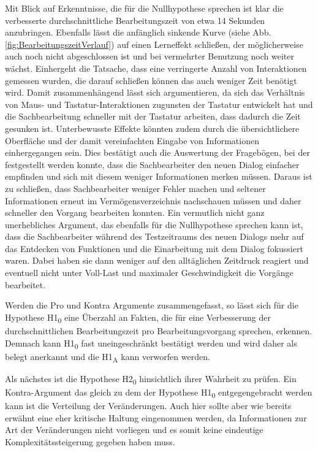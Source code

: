 Mit Blick auf Erkenntnisse, die für die Nullhypothese sprechen ist klar die verbesserte durchschnittliche Bearbeitungszeit von etwa 14 Sekunden anzubringen. Ebenfalls lässt die anfänglich sinkende Kurve (siehe Abb. \ref{fig:BearbeitungszeitVerlauf}) auf einen Lerneffekt schließen, der möglicherweise auch noch nicht abgeschlossen ist und bei vermehrter Benutzung noch weiter wächst. Einhergeht die Tatsache, dass eine verringerte Anzahl von Interaktionen gemessen wurden, die darauf schließen können das auch weniger Zeit benötigt wird. Damit zusammenhängend lässt sich argumentieren, da sich das Verhältnis von Maus- und Tastatur-Interaktionen zugunsten der Tastatur entwickelt hat und die Sachbearbeitung schneller mit der Tastatur arbeiten, dass dadurch die Zeit gesunken ist. Unterbewusste Effekte könnten zudem durch die übersichtlichere Oberfläche und der damit vereinfachten Eingabe von Informationen einhergegangen sein. Dies bestätigt auch die Auswertung der Fragebögen, bei der festgestellt werden konnte, dass die Sachbearbeiter den neuen Dialog einfacher empfinden und sich mit diesem weniger Informationen merken müssen. Daraus ist zu schließen, dass Sachbearbeiter weniger Fehler machen und seltener Informationen erneut im Vermögensverzeichnis nachschauen müssen und daher schneller den Vorgang bearbeiten konnten. Ein vermutlich nicht ganz unerhebliches Argument, das ebenfalls für die Nullhypothese sprechen kann ist, dass die Sachbearbeiter während des Testzeitraums des neuen Dialogs mehr auf das Entdecken von Funktionen und die Einarbeitung mit dem Dialog fokussiert waren. Dabei haben sie dann weniger auf den alltäglichen Zeitdruck reagiert und eventuell nicht unter Voll-Last und maximaler Geschwindigkeit die Vorgänge bearbeitet.

Werden die Pro und Kontra Argumente zusammengefasst, so lässt sich für die Hypothese H1\textsubscript{0} eine Überzahl an Fakten, die für eine Verbesserung der durchschnittlichen Bearbeitungszeit pro Bearbeitungsvorgang sprechen, erkennen. Demnach kann H1\textsubscript{0} fast uneingeschränkt bestätigt werden und wird daher als belegt anerkannt und die H1\textsubscript{A} kann verworfen werden.

Als nächstes ist die Hypothese H2\textsubscript{0} hinsichtlich ihrer Wahrheit zu prüfen. Ein Kontra-Argument das gleich zu dem der Hypothese H1\textsubscript{0} entgegengebracht werden kann ist die Verteilung der Veränderungen. Auch hier sollte aber wie bereits erwähnt eine eher kritische Haltung eingenommen werden, da Informationen zur Art der Veränderungen nicht vorliegen und es somit keine eindeutige Komplexitätssteigerung gegeben haben muss. 

